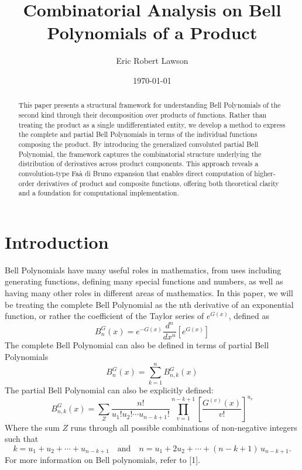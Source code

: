 \documentclass[11pt]{article}
\title{Combinatorial Analysis on Bell Polynomials of a
Product}
\author{Eric Robert Lawson}
\affil{Independent Researcher}
\date{\today}
\theoremstyle{plain}
\theoremstyle{definition}
\begin{document}
\maketitle
\begin{abstract}
This paper presents a structural framework for understanding Bell Polynomials of the second kind through their decomposition over products of functions. Rather than treating the product as a single undifferentiated entity, we develop a method to express the complete and partial Bell Polynomials in terms of the individual functions composing the product. By introducing the generalized convoluted partial Bell Polynomial, the framework captures the combinatorial structure underlying the distribution of derivatives across product components. This approach reveals a convolution-type Faà di Bruno expansion that enables direct computation of higher-order derivatives of product and composite functions, offering both theoretical clarity and a foundation for computational implementation.
\end{abstract}

\section{Introduction}
Bell Polynomials have many useful roles in mathematics, from uses including generating functions, defining many special functions and numbers, as well as having many other roles in different areas of mathematics. In this paper, we will be treating the complete Bell Polynomial as the nth derivative of an exponential function, or rather the coefficient of the Taylor series of $e^{G(x)}$, defined as
\begin{equation*}
    B_n^G(x) = e^{-G(x)} \frac{d^n}{dx^n} \left[e^{G(x)}\right]
\end{equation*}
The complete Bell Polynomial can also be defined in terms of partial Bell Polynomials
\begin{equation*}
    B_n^G(x) = \sum_{k=1}^n B_{n,k}^G(x)
\end{equation*}
The partial Bell Polynomial can also be explicitly defined:
\begin{equation*}
    B_{n,k}^G(x) = \sum_{Z} \frac{n!}{u_1! u_2! \cdots u_{n-k+1}!} \prod_{v=1}^{n-k+1} \left[\frac{G^{(v)}(x)}{v!}\right]^{u_v}
\end{equation*}
Where the sum \(Z\) runs through all possible combinations of non‑negative integers such that
\[
k = u_1 + u_2 + \cdots + u_{n-k+1}
\quad\text{and}\quad
n = u_1 + 2u_2 + \cdots + (n - k + 1)\,u_{n-k+1}.
\]
For more information on Bell polynomials, refer to [1].
\end{document}
